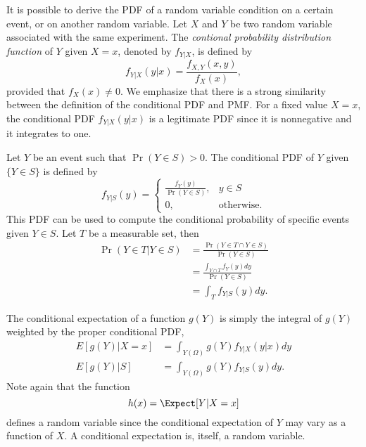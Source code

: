 It is possible to derive the PDF of a random variable condition on a certain event, or on another random variable.
Let $X$ and $Y$ be two random variable associated with the same experiment.
The \emph{contional probability distribution function} of $Y$ given $X = x$, denoted by $f_{Y|X}$, is defined by
\begin{equation} \label{equation:ContinuousConditonalPDF}
f_{Y|X} (y|x) = \frac{f_{X,Y} (x,y)}{f_X(x)},
\end{equation}
provided that $f_X(x) \neq 0$.
We emphasize that there is a strong similarity between the definition of the conditional PDF and PMF.
For a fixed value $X = x$, the conditional PDF $f_{Y|X} (y|x)$ is a legitimate PDF since it is nonnegative and it integrates to one.

\begin{example}
\end{example}

Let $Y$ be an event such that $\Pr (Y \in S) > 0$.
The conditional PDF of $Y$ given $\{ Y \in S \}$ is defined by
\begin{equation*}
f_{Y|S} (y)
= \left\{ \begin{array}{cc} \frac{ f_Y(y) }{\Pr (Y \in S)}, & y \in S \\
0, & \text{otherwise}. \end{array} \right.
\end{equation*}
This PDF can be used to compute the conditional probability of specific events given $Y \in S$.
Let $T$ be a measurable set, then
\begin{equation*}
\begin{split}
\Pr ( Y \in T | Y \in S)
&= \frac{ \Pr ( Y \in T \cap Y \in S) }{ \Pr ( Y \in S) } \\
&= \frac{ \int_{Y \cap T} f_Y(y) dy }{ \Pr ( Y \in S) } \\
&= \int_{T} f_{Y|S} (y) dy .
\end{split}
\end{equation*}

\begin{example}
\end{example}

The conditional expectation of a function $g(Y)$ is simply the integral of $g(Y)$ weighted by the proper conditional PDF,
\begin{align*}
E[g(Y) | X = x] &= \int_{Y(\Omega)} g(Y) f_{Y|X} (y|x) dy \\
E[g(Y) | S] &= \int_{Y(\Omega)} g(Y) f_{Y|S} (y) dy .
\end{align*}
Note again that the function
\begin{equation*}
h(x) = \Expect [Y | X=x]
\end{equation*}
defines a random variable since the conditional expectation of $Y$ may vary as a function of $X$.
A conditional expectation is, itself, a random variable.

